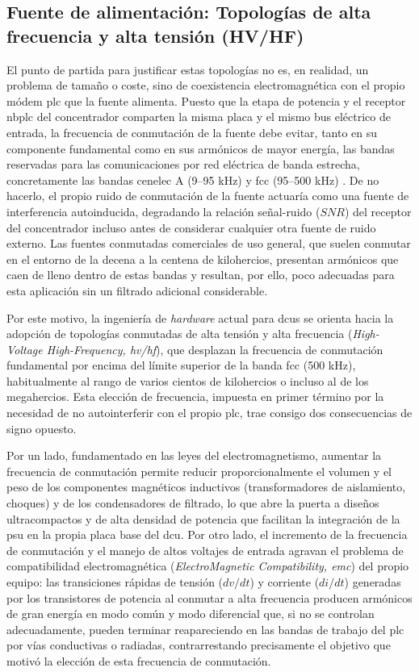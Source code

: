 \subsection{Fuente de alimentación: Topologías de alta frecuencia y alta tensión (HV/HF)}
\label{subsec:topologias_alta_frecuencia_tension}

El punto de partida para justificar estas topologías no es, en realidad, un problema de tamaño o coste, sino de coexistencia electromagnética con el propio módem \gls{plc} que la fuente alimenta. Puesto que la etapa de potencia y el receptor \gls{nbplc} del concentrador comparten la misma placa y el mismo bus eléctrico de entrada, la frecuencia de conmutación de la fuente debe evitar, tanto en su componente fundamental como en sus armónicos de mayor energía, las bandas reservadas para las comunicaciones por red eléctrica de banda estrecha, concretamente las bandas \gls{cenelec} A (9--95 kHz) y \gls{fcc} (95--500 kHz) \cite{SHARMA2017704, 6679210}. De no hacerlo, el propio ruido de conmutación de la fuente actuaría como una fuente de interferencia autoinducida, degradando la relación señal-ruido ($SNR$) del receptor del concentrador incluso antes de considerar cualquier otra fuente de ruido externo. Las fuentes conmutadas comerciales de uso general, que suelen conmutar en el entorno de la decena a la centena de kilohercios, presentan armónicos que caen de lleno dentro de estas bandas y resultan, por ello, poco adecuadas para esta aplicación sin un filtrado adicional considerable.

Por este motivo, la ingeniería de \textit{hardware} actual para \glspl{dcu} se orienta hacia la adopción de topologías conmutadas de alta tensión y alta frecuencia (\textit{High-Voltage High-Frequency, \gls{hv}/\gls{hf}}), que desplazan la frecuencia de conmutación fundamental por encima del límite superior de la banda \gls{fcc} (500 kHz), habitualmente al rango de varios cientos de kilohercios o incluso al de los megahercios. Esta elección de frecuencia, impuesta en primer término por la necesidad de no autointerferir con el propio \gls{plc}, trae consigo dos consecuencias de signo opuesto.

Por un lado, fundamentado en las leyes del electromagnetismo, aumentar la frecuencia de conmutación permite reducir proporcionalmente el volumen y el peso de los componentes magnéticos inductivos (transformadores de aislamiento, choques) y de los condensadores de filtrado, lo que abre la puerta a diseños ultracompactos y de alta densidad de potencia que facilitan la integración de la \gls{psu} en la propia placa base del \gls{dcu}. Por otro lado, el incremento de la frecuencia de conmutación y el manejo de altos voltajes de entrada agravan el problema de compatibilidad electromagnética (\textit{ElectroMagnetic Compatibility, \gls{emc}}) del propio equipo: las transiciones rápidas de tensión ($dv/dt$) y corriente ($di/dt$) generadas por los transistores de potencia al conmutar a alta frecuencia producen armónicos de gran energía en modo común y modo diferencial que, si no se controlan adecuadamente, pueden terminar reapareciendo en las bandas de trabajo del \gls{plc} por vías conductivas o radiadas, contrarrestando precisamente el objetivo que motivó la elección de esta frecuencia de conmutación.

